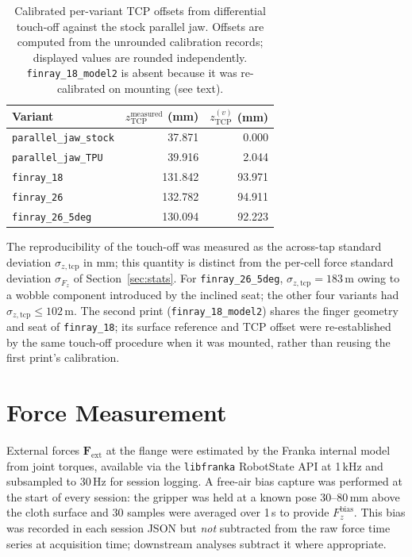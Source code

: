 \begin{table}[ht]
\centering
\caption[Calibrated TCP offsets]{Calibrated per-variant TCP offsets from
differential touch-off against the stock parallel jaw. Offsets are
computed from the unrounded calibration records; displayed values are
rounded independently. \texttt{finray\_18\_model2} is absent because it
was re-calibrated on mounting (see text).}
\label{tab:tcp-calib}
\begin{tabular}{lrr}
\toprule
Variant & $z_{\text{TCP}}^{\text{measured}}$ (mm) & $z_{\text{TCP}}^{(v)}$ (mm) \\
\midrule
\texttt{parallel\_jaw\_stock}    & 37.871 & 0.000 \\
\texttt{parallel\_jaw\_TPU}      & 39.916 & 2.044 \\
\texttt{finray\_18}              & 131.842 & 93.971 \\
\texttt{finray\_26}              & 132.782 & 94.911 \\
\texttt{finray\_26\_5deg}        & 130.094 & 92.223 \\
\bottomrule
\end{tabular}
\end{table}

The reproducibility of the touch-off was measured as the across-tap standard
deviation $\sigma_{z,\text{tcp}}$ in mm; this quantity is distinct from
the per-cell force standard deviation $\sigma_{F_z}$ of
Section~\ref{sec:stats}. For \texttt{finray\_26\_5deg},
$\sigma_{z,\text{tcp}} = 183$\,\textmu m owing to a wobble component
introduced by the inclined seat; the other four variants had
$\sigma_{z,\text{tcp}} \leq 102$\,\textmu m. The second print
(\texttt{finray\_18\_model2}) shares the finger geometry and seat of
\texttt{finray\_18}; its surface reference and TCP offset were
re-established by the same touch-off procedure when it was mounted,
rather than reusing the first print's calibration.

\section{Force Measurement}

External forces $\mathbf{F}_{\text{ext}}$ at the flange were estimated by the
Franka internal model from joint torques, available via the \texttt{libfranka}
RobotState API at 1\,kHz and subsampled to 30\,Hz for session logging.
A free-air bias capture was performed at the start of every session: the
gripper was held at a known pose 30--80\,mm above the cloth surface and
30 samples were averaged over 1\,s to provide $F_z^{\text{bias}}$.
This bias was recorded in each session JSON but \emph{not} subtracted from
the raw force time series at acquisition time; downstream analyses subtract
it where appropriate.

